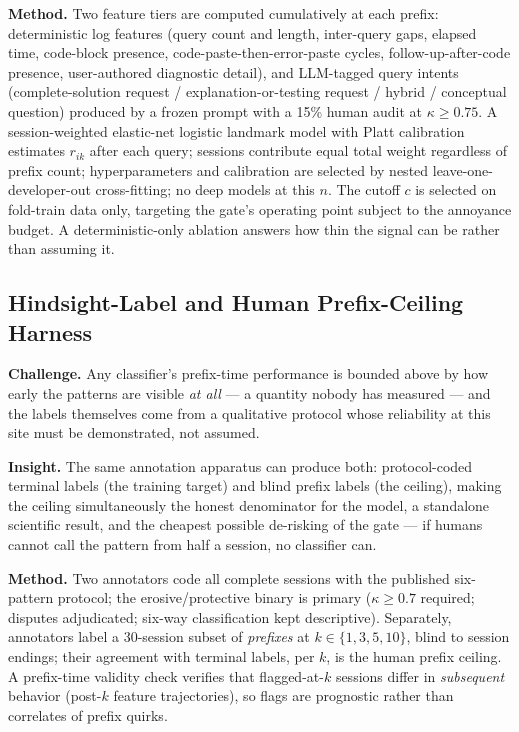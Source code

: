 \documentclass[11pt]{article}
\begin{document}
\textbf{Method.} Two feature tiers are computed cumulatively at each prefix: deterministic log features (query count and length, inter-query gaps, elapsed time, code-block presence, code-paste-then-error-paste cycles, follow-up-after-code presence, user-authored diagnostic detail), and LLM-tagged query intents (complete-solution request / explanation-or-testing request / hybrid / conceptual question) produced by a frozen prompt with a 15\% human audit at $\kappa \geq 0.75$. A session-weighted elastic-net logistic landmark model with Platt calibration estimates $r_{ik}$ after each query; sessions contribute equal total weight regardless of prefix count; hyperparameters and calibration are selected by nested leave-one-developer-out cross-fitting; no deep models at this $n$. The cutoff $c$ is selected on fold-train data only, targeting the gate's operating point subject to the annoyance budget. A deterministic-only ablation answers how thin the signal can be rather than assuming it.

\subsection{Hindsight-Label and Human Prefix-Ceiling Harness}

\textbf{Challenge.} Any classifier's prefix-time performance is bounded above by how early the patterns are visible \emph{at all} --- a quantity nobody has measured --- and the labels themselves come from a qualitative protocol whose reliability at this site must be demonstrated, not assumed.

\textbf{Insight.} The same annotation apparatus can produce both: protocol-coded terminal labels (the training target) and blind prefix labels (the ceiling), making the ceiling simultaneously the honest denominator for the model, a standalone scientific result, and the cheapest possible de-risking of the gate --- if humans cannot call the pattern from half a session, no classifier can.

\textbf{Method.} Two annotators code all complete sessions with the published six-pattern protocol; the erosive/protective binary is primary ($\kappa \geq 0.7$ required; disputes adjudicated; six-way classification kept descriptive). Separately, annotators label a 30-session subset of \emph{prefixes} at $k \in \{1,3,5,10\}$, blind to session endings; their agreement with terminal labels, per $k$, is the human prefix ceiling. A prefix-time validity check verifies that flagged-at-$k$ sessions differ in \emph{subsequent} behavior (post-$k$ feature trajectories), so flags are prognostic rather than correlates of prefix quirks.
\end{document}
